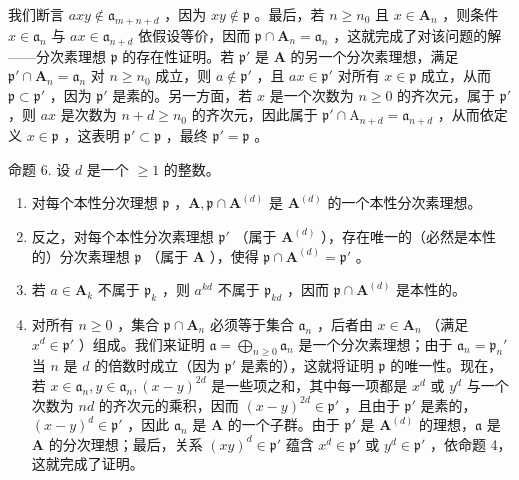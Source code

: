 我们断言 \(axy \notin \mathfrak{a}_{m+n+d}\) ，因为 \(xy \notin \mathfrak{p}\) 。最后，若 \(n \geqslant n_0\) 且 \(x \in \mathbf{A}_n\) ，则条件 \(x \in \mathfrak{a}_n\) 与 \(ax \in \mathfrak{a}_{n+d}\) 依假设等价，因而 \(\mathfrak{p} \cap \mathbf{A}_n = \mathfrak{a}_n\) ，这就完成了对该问题的解——分次素理想 \(\mathfrak{p}\) 的存在性证明。若 \(\mathfrak{p}'\) 是 \(\mathbf{A}\) 的另一个分次素理想，满足 \(\mathfrak{p}' \cap \mathbf{A}_n = \mathfrak{a}_n\) 对 \(n \geqslant n_0\) 成立，则 \(a \notin \mathfrak{p}'\) ，且 \(ax \in \mathfrak{p}'\) 对所有 \(x \in \mathfrak{p}\) 成立，从而 \(\mathfrak{p} \subset \mathfrak{p}'\) ，因为 \(\mathfrak{p}'\) 是素的。另一方面，若 \(x\) 是一个次数为 \(n \geqslant 0\) 的齐次元，属于 \(\mathfrak{p}'\) ，则 \(ax\) 是次数为 \(n + d \geqslant n_0\) 的齐次元，因此属于 \(\mathfrak{p}' \cap \mathrm{A}_{n+d} = \mathfrak{a}_{n+d}\) ，从而依定义 \(x \in \mathfrak{p}\) ，这表明 \(\mathfrak{p}' \subset \mathfrak{p}\) ，最终 \(\mathfrak{p}' = \mathfrak{p}\) 。

命题 6. 设 \(d\) 是一个 \(\geqslant 1\) 的整数。

\begin{enumerate}
\def\labelenumi{(\roman{enumi})}
\item
  对每个本性分次理想 \(\mathfrak{p}\) ，\(\mathbf{A},\mathfrak{p}\cap \mathbf{A}^{(d)}\) 是 \(\mathbf{A}^{(d)}\) 的一个本性分次素理想。
\item
  反之，对每个本性分次素理想 \(\mathfrak{p}'\) （属于 \(\mathbf{A}^{(d)}\) ），存在唯一的（必然是本性的）分次素理想 \(\mathfrak{p}\) （属于 \(\mathbf{A}\) ），使得 \(\mathfrak{p} \cap \mathbf{A}^{(d)} = \mathfrak{p}'\) 。
\item
  若 \(a \in \mathbf{A}_k\) 不属于 \(\mathfrak{p}_k\) ，则 \(a^{kd}\) 不属于 \(\mathfrak{p}_{kd}\) ，因而 \(\mathfrak{p} \cap \mathbf{A}^{(d)}\) 是本性的。
\item
  对所有 \(n \geqslant 0\) ，集合 \(\mathfrak{p} \cap \mathbf{A}_n\) 必须等于集合 \(\mathfrak{a}_n\) ，后者由 \(x \in \mathbf{A}_n\) （满足 \(x^d \in \mathfrak{p}'\) ）组成。我们来证明 \(\mathfrak{a} = \bigoplus_{n \geqslant 0} \mathfrak{a}_n\) 是一个分次素理想；由于 \(\mathfrak{a}_n = \mathfrak{p}_n'\) 当 \(n\) 是 \(d\) 的倍数时成立（因为 \(\mathfrak{p}'\) 是素的），这就将证明 \(\mathfrak{p}\) 的唯一性。现在，若 \(x \in \mathfrak{a}_n, y \in \mathfrak{a}_n, (x - y)^{2d}\) 是一些项之和，其中每一项都是 \(x^d\) 或 \(y^d\) 与一个次数为 \(nd\) 的齐次元的乘积，因而 \((x - y)^{2d} \in \mathfrak{p}'\) ，且由于 \(\mathfrak{p}'\) 是素的，\((x - y)^d \in \mathfrak{p}'\) ，因此 \(\mathfrak{a}_n\) 是 \(\mathbf{A}\) 的一个子群。由于 \(\mathfrak{p}'\) 是 \(\mathbf{A}^{(d)}\) 的理想，\(\mathfrak{a}\) 是 \(\mathbf{A}\) 的分次理想；最后，关系 \((xy)^d \in \mathfrak{p}'\) 蕴含 \(x^d \in \mathfrak{p}'\) 或 \(y^d \in \mathfrak{p}'\) ，依命题 4，这就完成了证明。
\end{enumerate}

